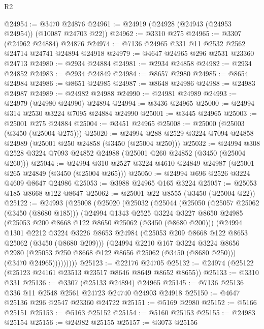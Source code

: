 \begin{lexlean}{R2}
\begin{coremodule}
@24954 := @3470 @24876
@24961 := @24919 (@24928 (@24943 (@24953 @24954)) (@10087 @24703 @22))
@24962 := @3310 @275
@24965 := @3307 (@24962 @24884) @24876
@24974 := @7136 @24965 @331 @11 @2532 @2562 @24714 @24741 @24894 @24918
@24979 := @4647 @24965 @296 @2531 @23360 @24713
@24980 := @2934 @24884
@24981 := @2934 @24858
@24982 := @2934 @24852
@24983 := @2934 @24849
@24984 := @8657 @2980
@24985 := @8654 @24984
@24986 := @8651 @24985
@24987 := @8648 @24986
@24988 := @24983 @24987
@24989 := @24982 @24988
@24990 := @24981 @24989
@24993 := @24979 (@24980 @24990) @24894
@24994 := @3436 @24965
@25000 := @24994 @314 @2530 @3224 @7095 @24884 @24990
@25001 := @3445 @24965
@25003 := @25001 @275 @24884
@25004 := @3451 @24965
@25008 := @25000 (@25003 (@3450 (@25004 @275)))
@25020 := @24994 @288 @2529 @3224 @7094 @24858 @24989 (@25001 @250 @24858 (@3450 (@25004 @250)))
@25032 := @24994 @308 @2528 @3224 @7093 @24852 @24988 (@25001 @260 @24852 (@3450 (@25004 @260)))
@25044 := @24994 @310 @2527 @3224 @4610 @24849 @24987 (@25001 @265 @24849 (@3450 (@25004 @265)))
@25050 := @24994 @696 @2526 @3224 @4609 @8647 @24986
@25053 := @3988 @24965 @165 @3224
@25057 := @25053 @185 @8668 @122 @8647
@25062 := @25001 @22 @8555 (@3450 (@25004 @22))
@25122 := @24993
    (@25008
      (@25020
        (@25032
          (@25044
            (@25050
              (@25057 @25062 (@3450 (@8680 @185)))
              (@24994
                @1343
                @2525
                @3224
                @3227
                @8650
                @24985
                (@25053 @200 @8668 @122 @8650 @25062 (@3450 (@8680 @200)))
                (@24994
                  @1301
                  @2212
                  @3224
                  @3226
                  @8653
                  @24984
                  (@25053 @209 @8668 @122 @8653 @25062 (@3450 (@8680 @209)))
                  (@24994
                    @2210
                    @167
                    @3224
                    @3224
                    @8656
                    @2980
                    (@25053 @250 @8668 @122 @8656 @25062 (@3450 (@8680 @250)))
                    (@3470 @24965)))))))))
@25123 := @22176 @24705
@25132 := @24974 (@25122 (@25123 @24161 @23513 @23517 @8646 @8649 @8652 @8655))
@25133 := @3310 @331
@25136 := @3307 (@25133 @24894) @24965
@25145 := @7136 @25136 @336 @11 @2548 @2561 @24723 @24740 @24903 @24918
@25150 := @4647 @25136 @296 @2547 @23360 @24722
@25151 := @5169 @2980
@25152 := @5166 @25151
@25153 := @5163 @25152
@25154 := @5160 @25153
@25155 := @24983 @25154
@25156 := @24982 @25155
@25157 := @3073 @25156

\end{coremodule}
\end{lexlean}
